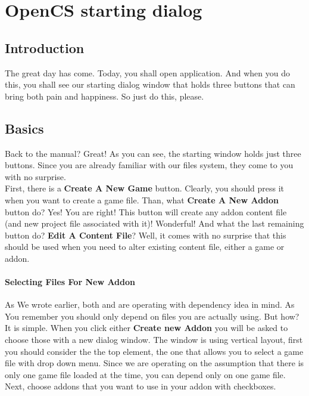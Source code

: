 \section{OpenCS starting dialog}
\subsection{Introduction}
The great day has come. Today, you shall open \OCS{} application. And when you do this, you shall see our starting dialog window that holds three buttons
that can bring both pain and happiness. So just do this, please.

\subsection{Basics}
Back to the manual? Great! As you can see, the starting window holds just three buttons. Since you are already familiar with our files system, they come
to you with no surprise.\\

First, there is a \textbf{Create A New Game} button. Clearly, you should press it when you want to create a game file. Than, what \textbf{Create A New Addon} button do?
Yes! You are right! This button will create any addon content file (and new project file associated with it)! Wonderful! And what the last remaining button do? \textbf{Edit A Content File}? Well, it comes with no surprise that this should be used when you need to alter existing content file, either a game or addon.\\

\paragraph{Selecting Files For New Addon}
As We wrote earlier, both \OMW{} and \OCS{} are operating with dependency idea in mind. As You remember you should only depend on files you are actually using. But how?\\
It is simple. When you click either \textbf{Create new Addon} you will be asked to choose those with a new dialog window. The window is using vertical layout, first you should consider the the top element, the one that allows you to select a game file with drop down menu. Since we are operating on the assumption that there is only one game file loaded at the time, you can depend only on one game file. Next, choose addons that you want to use in your addon with checkboxes.\\

